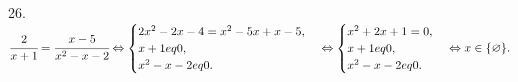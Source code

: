 26. $\cfrac{2}{x+1}=\cfrac{x-5}{x^2-x-2}\Leftrightarrow\begin{cases}
2x^2-2x-4=x^2-5x+x-5,\\
x+1
eq0,\\ x^2-x-2
eq0.\end{cases}\Leftrightarrow  \begin{cases}
x^2+2x+1=0,\\
x+1
eq0,\\ x^2-x-2
eq0.\end{cases}\Leftrightarrow x\in\{\varnothing\}.$\\
